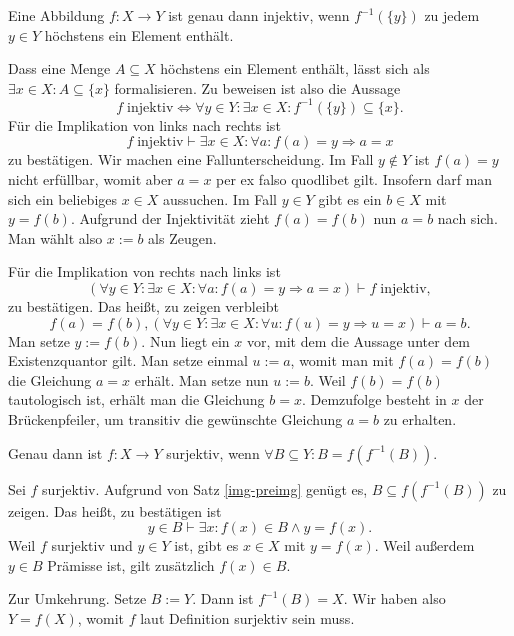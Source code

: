 \begin{Satz}
Eine Abbildung $f\colon X\to Y$ ist genau dann injektiv, wenn
$f^{-1}(\{y\})$ zu jedem $y\in Y$ höchstens ein Element enthält.
\end{Satz}
\begin{Beweis}
Dass eine Menge $A\subseteq X$ höchstens ein Element enthält,
lässt sich als $\exists x\in X\colon A\subseteq\{x\}$ formalisieren.
Zu beweisen ist also die Aussage
\[f\;\text{injektiv}\iff\forall y\in Y\colon\exists x\in X\colon f^{-1}(\{y\})\subseteq\{x\}.\]
Für die Implikation von links nach rechts ist
\[f\;\text{injektiv}\vdash\exists x\in X\colon \forall a\colon f(a)=y\Rightarrow a=x\]
zu bestätigen. Wir machen eine Fallunterscheidung. Im Fall $y\notin Y$
ist $f(a)=y$ nicht erfüllbar, womit aber $a=x$ per ex falso quodlibet
gilt. Insofern darf man sich ein beliebiges $x\in X$ aussuchen.
Im Fall $y\in Y$ gibt es ein $b\in X$ mit $y=f(b)$. Aufgrund
der Injektivität zieht $f(a)=f(b)$ nun $a=b$ nach sich. Man wählt
also $x:=b$ als Zeugen.

Für die Implikation von rechts nach links ist
\[(\forall y\in Y\colon\exists x\in X\colon
\forall a\colon f(a)=y\Rightarrow a=x)
\vdash f\;\text{injektiv},\]
zu bestätigen. Das heißt, zu zeigen verbleibt
\[f(a)=f(b), (\forall y\in Y\colon\exists x\in X\colon
\forall u\colon f(u)=y\Rightarrow u=x)
\vdash a=b.\]
Man setze $y:=f(b)$. Nun liegt ein $x$ vor, mit dem die Aussage
unter dem Existenzquantor gilt. Man setze einmal $u:=a$, womit man
mit $f(a)=f(b)$ die Gleichung $a=x$ erhält. Man setze nun $u:=b$.
Weil $f(b)=f(b)$ tautologisch ist, erhält man
die Gleichung $b=x$. Demzufolge besteht in $x$ der Brückenpfeiler,
um transitiv die gewünschte Gleichung $a=b$ zu erhalten.\,\qedsymbol
\end{Beweis}

\newpage
\begin{Satz}\label{sur-img-of-preimg}
Genau dann ist $f\colon X\to Y$ surjektiv,
wenn $\forall B\subseteq Y\colon B=f(f^{-1}(B))$.
\end{Satz}
\begin{Beweis}
Sei $f$ surjektiv. Aufgrund von Satz \ref{img-preimg} genügt es,
$B\subseteq f(f^{-1}(B))$ zu zeigen. Das heißt, zu bestätigen ist
\[y\in B\vdash\exists x\colon f(x)\in B\land y=f(x).\]
Weil $f$ surjektiv und $y\in Y$ ist, gibt es $x\in X$ mit $y=f(x)$.
Weil außerdem $y\in B$ Prämisse ist, gilt zusätzlich $f(x)\in B$.

Zur Umkehrung. Setze $B:=Y$. Dann ist $f^{-1}(B)=X$. Wir haben also
$Y=f(X)$, womit $f$ laut Definition surjektiv sein muss.\,\qedsymbol
\end{Beweis}

